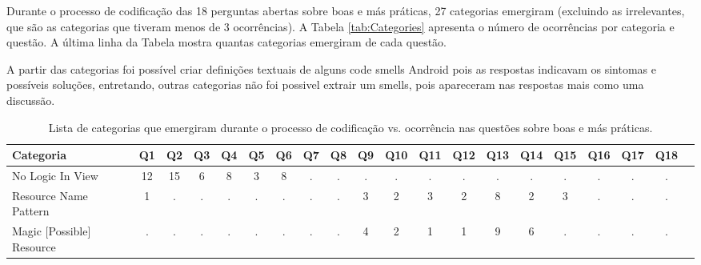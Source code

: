 Durante o processo de codifica\c{c}\~ao das 18 perguntas abertas sobre boas e m\'as pr\'aticas, 27 categorias emergiram (excluindo as irrelevantes, que s\~ao as categorias que tiveram menos de 3 ocorrências). A Tabela \ref{tab:Categories} apresenta o n\'umero de ocorr\^encias por categoria e quest\~ao. A \'ultima linha da Tabela mostra quantas categorias emergiram de cada quest\~ao. 

A partir das categorias foi poss\'ivel criar defini\c{c}\~oes textuais de alguns code smells Android pois as respostas indicavam os sintomas e poss\'iveis solu\c{c}\~oes, entretando, outras categorias n\~ao foi possivel extrair um smells, pois apareceram nas respostas mais como uma discuss\~ao.

\begin{table*}[t]
\centering
\caption{Lista de categorias que emergiram durante o processo de codifica\c{c}\~ao vs. ocorr\^encia nas quest\~oes sobre boas e m\'as pr\'aticas.}
\small
\begin{tabular}{p{4cm}|p{.3cm}p{.3cm}p{.3cm}p{.3cm}p{.3cm}p{.3cm}p{.3cm}p{.3cm}p{.3cm}p{.4cm}p{.4cm}p{.4cm}p{.4cm}p{.4cm}p{.4cm}p{.4cm}p{.4cm}p{.4cm}p{.4cm}}
\toprule
\textbf{Categoria} & Q1 & Q2 & Q3 & Q4 & Q5 & Q6 & Q7 & Q8 & Q9 & Q10 & Q11 & Q12 & Q13 & Q14 & Q15 & Q16 & Q17 & Q18 \\
\hline
No Logic In View							& \multicolumn{1}{c}{12}	& \multicolumn{1}{c}{15}	& \multicolumn{1}{c}{6}	& \multicolumn{1}{c}{8}	& \multicolumn{1}{c}{3}	& \multicolumn{1}{c}{8}	& \multicolumn{1}{c}{.}	& \multicolumn{1}{c}{.}	& \multicolumn{1}{c}{.}	& \multicolumn{1}{c}{.}	& \multicolumn{1}{c}{.}	& \multicolumn{1}{c}{.}	& \multicolumn{1}{c}{.}	& \multicolumn{1}{c}{.}	& \multicolumn{1}{c}{.}	& \multicolumn{1}{c}{.}	& \multicolumn{1}{c}{.}	& \multicolumn{1}{c}{.}  \\
Resource Name Pattern						& \multicolumn{1}{c}{1}	& \multicolumn{1}{c}{.}	& \multicolumn{1}{c}{.}	& \multicolumn{1}{c}{.}	& \multicolumn{1}{c}{.}	& \multicolumn{1}{c}{.}	& \multicolumn{1}{c}{.}	& \multicolumn{1}{c}{.}	& \multicolumn{1}{c}{3}	& \multicolumn{1}{c}{2}	& \multicolumn{1}{c}{3}	& \multicolumn{1}{c}{2}	& \multicolumn{1}{c}{8}	& \multicolumn{1}{c}{2}	& \multicolumn{1}{c}{3}	& \multicolumn{1}{c}{.}	& \multicolumn{1}{c}{.}	& \multicolumn{1}{c}{.} 		 \\
Magic [Possible] Resource					& \multicolumn{1}{c}{.}	& \multicolumn{1}{c}{.}	& \multicolumn{1}{c}{.}	& \multicolumn{1}{c}{.}	& \multicolumn{1}{c}{.}	& \multicolumn{1}{c}{.}	& \multicolumn{1}{c}{.}	& \multicolumn{1}{c}{.}	& \multicolumn{1}{c}{4}	& \multicolumn{1}{c}{2}	& \multicolumn{1}{c}{1}	& \multicolumn{1}{c}{1}	& \multicolumn{1}{c}{9}	& \multicolumn{1}{c}{6}	& \multicolumn{1}{c}{.}	& \multicolumn{1}{c}{.}	& \multicolumn{1}{c}{.}	& \multicolumn{1}{c}{.} 		 \\

\end{tabular}
\end{table*}
